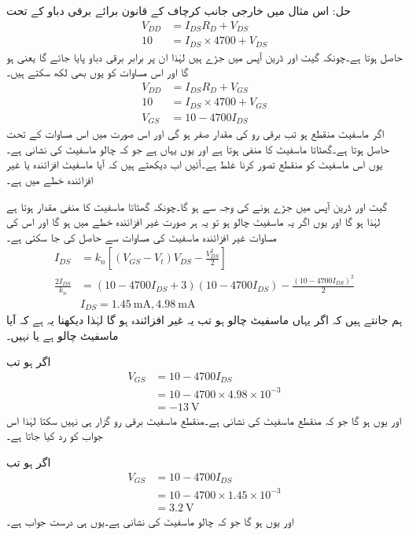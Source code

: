 حل:	اس مثال میں خارجی جانب کرچاف کے قانون برائے برقی دباو کے تحت
\begin{align*}
V_{DD}&=I_{DS}R_D+V_{DS}\\
10&=I_{DS}\times 4700+V_{DS}
\end{align*}
حاصل ہوتا ہے۔چونکہ گیٹ اور ڈرین آپس میں جڑے ہیں لہٰذا ان پر برابر برقی دباو پایا جائے گا یعنی   ہو گا اور اس مساوات کو یوں بھی لکھ سکتے ہیں۔
\begin{align*}
V_{DD}&=I_{DS}R_D+V_{GS}\\
10&=I_{DS} \times 4700+V_{GS}\\
V_{GS}&=10-4700 I_{DS}
\end{align*}
اگر ماسفیٹ منقطع ہو تب برقی رو کی مقدار صفر ہو گی اور اس صورت میں اس مساوات کے تحت   حاصل ہوتا ہے۔گھٹاتا ماسفیٹ کا    منفی ہوتا ہے اور یوں یہاں  ہے جو کہ چالو ماسفیٹ کی نشانی ہے۔یوں اس ماسفیٹ کو منقطع تصور کرنا غلط ہے۔آئیں اب دیکھتے ہیں کہ آیا ماسفیٹ افزائندہ یا غیر افزائندہ خطے میں ہے۔

گیٹ اور ڈرین آپس میں جڑے ہونے کی وجہ سے  ہو گا۔چونکہ گھٹاتا ماسفیٹ کا  منفی مقدار ہوتا ہے لہٰذا   ہو گا اور یوں اگر یہ ماسفیٹ چالو  ہو تو یہ ہر صورت  غیر افزائندہ خطے میں ہو گا اور اس کی مساوات غیر افزائندہ ماسفیٹ کی مساوات سے حاصل کی جا سکتی ہے۔
\begin{align*}
I_{DS}&=k_n \left[\left(V_{GS}-V_t \right )V_{DS}-\frac{V_{DS}^2}{2}\right]\\
\frac{2 I_{DS}}{k_n}&=\left(10-4700 I_{DS}+3 \right )(10-4700I_{DS})-\frac{(10-4700I_{DS})^2}{2}\\
& I_{DS}=\SI{1.45}{\milli \ampere} , \SI{4.98}{\milli \ampere}
\end{align*}
ہم جانتے ہیں کہ اگر یہاں ماسفیٹ چالو ہو تب یہ غیر افزائندہ ہو گا لہٰذا دیکھنا یہ ہے کہ آیا ماسفیٹ چالو ہے یا نہیں۔

اگر  ہو تب 	
\begin{align*}
V_{GS}&=10-4700 I_{DS}\\
&=10-4700 \times 4.98 \times 10^{-3}\\
&=\SI{-13}{\volt}
\end{align*}
اور یوں  ہو گا جو کہ منقطع ماسفیٹ کی نشانی ہے۔منقطع ماسفیٹ برقی رو گزار ہی نہیں سکتا لہٰذا اس جواب کو رد کیا جاتا ہے۔

اگر  ہو تب 	
\begin{align*}
V_{GS}&=10-4700 I_{DS}\\
&=10-4700 \times 1.45 \times 10^{-3}\\
&=\SI{3.2}{\volt}
\end{align*}
اور یوں  ہو گا جو کہ چالو ماسفیٹ کی نشانی ہے۔یوں  ہی درست جواب ہے۔

